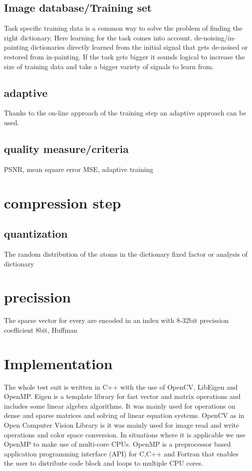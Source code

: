 \subsection{Image database/Training set}
Task specific training data is a common way to solve the problem of finding the right dictionary. 
Here learning for the task comes into account. de-noising/in-painting dictionaries directly learned from the initial
signal that gets de-noised or restored from in-painting.
If the task gets bigger it sounds logical to increase the size of training data and take a bigger variety of signals to learn from.

\subsection{adaptive}
Thanks to the on-line approach of the training step an adaptive approach can be used. 

\subsection{quality measure/criteria}
PSNR, mean square error MSE, adaptive training 

\section{compression step}
\subsection{quantization}
The random distribution of the atoms in the dictionary 
fixed factor or analysis of dictionary

\section{precission}
The sparse vector for every are encoded in an index with 8-32bit precission
coefficient 8bit, Huffman



\section{Implementation}

The whole test suit is written in C++ with the use of OpenCV, LibEigen and OpenMP.
Eigen \cite{Eigen} is a template library for fast vector and matrix operations and includes some linear algebra algorithms.
It was mainly used for operations on dense and sparse matrices and solving of linear equation systems.
OpenCV \cite{OpenCV} as in Open Computer Vision Library is it was mainly used for image read and write operations and color space conversion.
In situations where it is applicable we use OpenMP to make use of multi-core CPUs. OpenMP \cite{OpenMP}
is a preprocessor based application programming interface (API) for C,C++ and Fortran that enables 
the user to distribute code block and loops to multiple CPU cores. 


